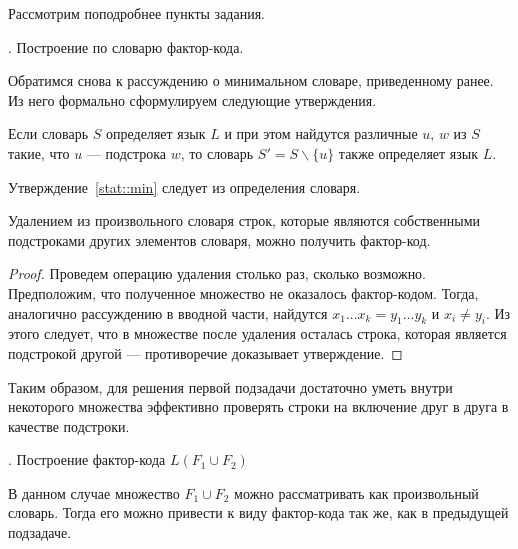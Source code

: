 \documentclass[14pt, russian]{scrartcl}
\begin{document}
Рассмотрим поподробнее пункты задания. 

\vspace{10pt}

{. Построение по словарю фактор-кода.

}

\vspace{4pt}

Обратимся снова к рассуждению о минимальном словаре, приведенному ранее. Из него формально сформулируем следующие утверждения.

\begin{Statement}
\label{stat::min}
Если словарь $S$ определяет язык $L$ и при этом найдутся различные $u,\, w$ из $S$ такие, что $u$ --- подстрока $w$, то словарь $S' = S \backslash \{u\}$ также определяет язык $L$. 
\end{Statement}

Утверждение~\ref{stat::min} следует из определения словаря.

\begin{Statement}
Удалением из произвольного словаря строк, которые являются собственными подстроками других элементов словаря, можно получить фактор-код.     
\end{Statement}
\begin{proof}
    Проведем операцию удаления столько раз, сколько возможно. Предположим, что полученное множество не оказалось фактор-кодом.
    \newline
    Тогда, аналогично рассуждению в вводной части, найдутся $ x_1...x_k = y_1...y_k  $ и $x_i \neq y_i$. Из этого следует, что в множестве после удаления осталась строка, которая является подстрокой другой --- противоречие доказывает утверждение.
\end{proof}

Таким образом, для решения первой подзадачи достаточно уметь внутри некоторого множества эффективно проверять строки на включение друг в друга в качестве подстроки.

\vspace{10pt}

{. Построение фактор-кода $L(F_1 \cup F_2)$

}

\vspace{4pt}

В данном случае множество $F_1\cup F_2$ можно рассматривать как произвольный словарь. Тогда его можно привести к виду фактор-кода так же, как в предыдущей подзадаче.
\end{document}
